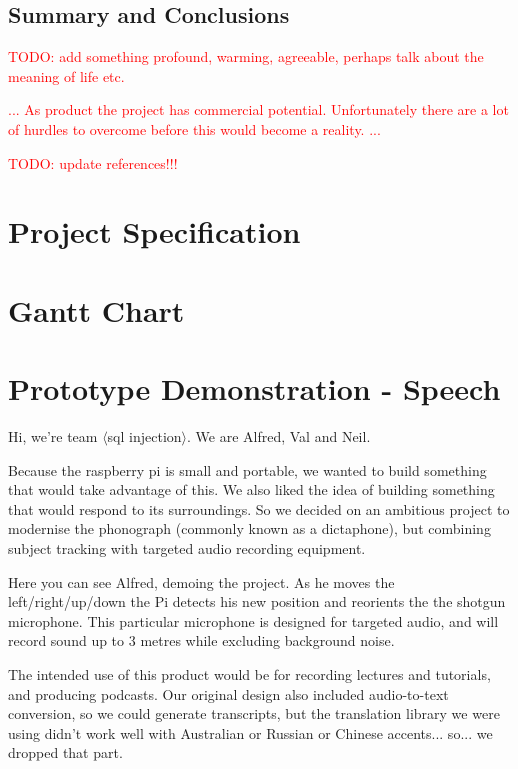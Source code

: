 \documentclass[11pt,a4paper,titlepage]{report}
\begin{document}
\section{Summary and Conclusions}

\textcolor{red}{TODO: add something profound, warming, agreeable, perhaps talk about the meaning of life etc.}

\textcolor{red}{... As product the project has commercial potential. Unfortunately there are a lot of hurdles to overcome before this would become a reality. ...}


\textcolor{red}{TODO: update references!!!}


\begin{appendices}


\chapter{Project Specification}



\chapter{Gantt Chart}



\chapter{Prototype Demonstration - Speech}

\newpage

Hi, we're team $\langle$sql injection$\rangle$. We are Alfred, Val and Neil.

Because the raspberry pi is small and portable, we wanted to build something that would take advantage of this. We also liked the idea of building something that would respond to its surroundings. So we decided on an ambitious project to modernise the phonograph (commonly known as a dictaphone), but combining subject tracking with targeted audio recording equipment.

Here you can see Alfred, demoing the project. As he moves the left/right/up/down the Pi detects his new position and reorients the the shotgun microphone. This particular microphone is designed for targeted audio, and will record sound up to 3 metres while excluding background noise. 

The intended use of this product would be for recording lectures and tutorials, and producing podcasts. Our original design also included audio-to-text conversion, so we could generate transcripts, but the translation library we were using didn’t work well with Australian or Russian or Chinese accents... so... we dropped that part.


\end{appendices}
\end{document}
